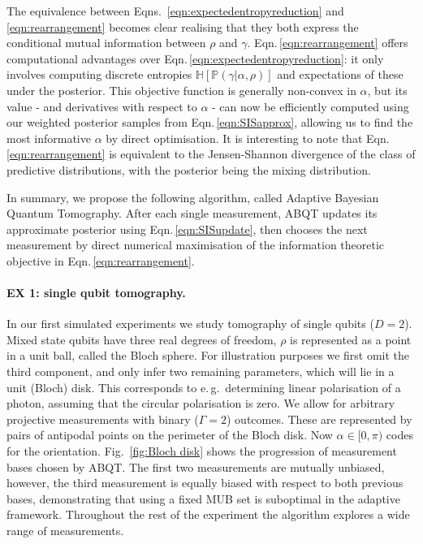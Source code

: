 \documentclass[aps,twocolumn,prl]{revtex4-1}
\newcommand{\param}{{\rho}} \newcommand{\data}{\mathcal{D}}
\newcommand{\config}{\alpha} \newcommand{\configset}{\mathcal{A}}
\newcommand{\outcome}{\gamma} \newcommand{\ie}{i.\,e.\ }
\newcommand{\eg}{e.\,g.\ }
\begin{document}
The equivalence between Eqns.\, \eqref{eqn:expectedentropyreduction} and \eqref{eqn:rearrangement} becomes clear realising that they both express the conditional mutual information between $\param$ and $\outcome$. Eqn.\,\eqref{eqn:rearrangement} offers computational advantages over Eqn.\,\eqref{eqn:expectedentropyreduction}: it only involves computing discrete entropies $\mathbb{H}\left[ \mathbb{P}(\outcome|\config,\param) \right]$ and expectations of these under the posterior. This objective function is generally non-convex in $\config$, but its value - and derivatives with respect to $\config$ - can now be efficiently computed using our weighted posterior samples from Eqn.\,\eqref{eqn:SISapprox}, allowing us to find the most informative $\config$ by direct optimisation. It is interesting to note that Eqn. \eqref{eqn:rearrangement} is equivalent to the Jensen-Shannon divergence of the class of predictive distributions, with the posterior being the mixing distribution.

In summary, we propose the following algorithm, called Adaptive Bayesian Quantum Tomography. After each single measurement, ABQT updates its approximate posterior using Eqn.\,\eqref{eqn:SISupdate}, then chooses the next measurement by direct numerical maximisation of the information theoretic objective in Eqn.\,\eqref{eqn:rearrangement}.

\paragraph{EX 1: single qubit tomography.} In our first simulated experiments we study tomography of single qubits ($D=2$). Mixed state qubits have three real degrees of freedom, $\rho$ is represented as a point in a unit ball, called the Bloch sphere. For illustration purposes we first omit the third component, and only infer two remaining parameters, which will lie in a unit (Bloch) disk. This corresponds to \eg determining linear polarisation of a photon, assuming that the circular polarisation is zero. We allow for arbitrary projective measurements with binary ($\Gamma = 2$) outcomes. These are represented by pairs of antipodal points on the perimeter of the Bloch disk. Now $\config\in[0,\pi)$ codes for the orientation. Fig.\ \ref{fig:Bloch disk} shows the progression of measurement bases chosen by ABQT. The first two measurements are mutually unbiased, however, the third measurement is equally biased with respect to both previous bases, demonstrating that using a fixed MUB set is suboptimal in the adaptive framework. Throughout the rest of the experiment the algorithm explores a wide range of measurements.
\end{document}
